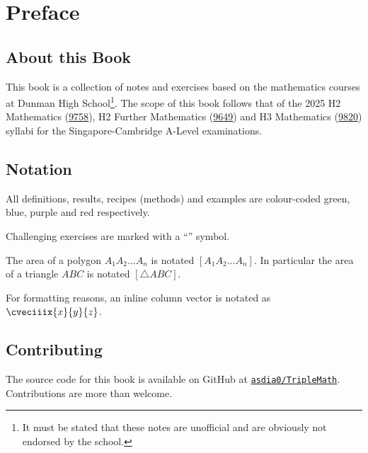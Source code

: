 \chapter*{Preface}

\section*{About this Book}

This book is a collection of notes and exercises based on the mathematics courses at Dunman High School\footnote{It must be stated that these notes are unofficial and are obviously not endorsed by the school.}. The scope of this book follows that of the 2025 H2 Mathematics (\href{https://www.seab.gov.sg/files/A%20Level%20Syllabus%20Sch%20Cddts/2025/8865_y25_sy.pdf}{9758}), H2 Further Mathematics (\href{https://www.seab.gov.sg/files/A%20Level%20Syllabus%20Sch%20Cddts/2025/9649_y25_sy.pdf}{9649}) and H3 Mathematics (\href{https://www.seab.gov.sg/files/A%20Level%20Syllabus%20Sch%20Cddts/2025/9820_y25_sy.pdf}{9820}) syllabi for the Singapore-Cambridge A-Level examinations.

\section*{Notation}

All definitions, results, recipes (methods) and examples are colour-coded green, blue, purple and red respectively. 

Challenging exercises are marked with a ``\chili'' symbol.

The area of a polygon $A_1 A_2 \dots A_n$ is notated $[A_1 A_2 \dots A_n]$. In particular the area of a triangle $ABC$ is notated $[\triangle ABC]$.

For formatting reasons, an inline column vector is notated as $\cveciiix{x}{y}{z}$.

\section*{Contributing}

The source code for this book is available on GitHub at \href{https://github.com/asdia0/TripleMath}{\texttt{asdia0/TripleMath}}. Contributions are more than welcome.